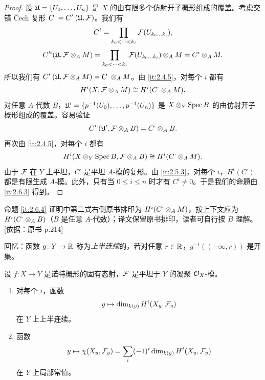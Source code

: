 \begin{proof}
设 $\mathfrak{U}=\{U_0,\dots,U_n\}$ 是 $X$ 的由有限多个仿射开子概形组成的覆盖。考虑交错 Čech 复形 $C^\cdot=C'^\cdot(\mathfrak{U},\mathcal{F})$。我们有
\[
C^i=\prod_{k_0<\cdots<k_i}\mathcal{F}(U_{k_0\dots k_i}),
\]
\[
C'^i(\mathfrak{U},\mathcal{F}\otimes_A M)=\prod_{k_0<\cdots<k_i}\mathcal{F}(U_{k_0\dots k_i})\otimes_A M=C^i\otimes_A M.
\]
所以我们有 $C'^\cdot(\mathfrak{U},\mathcal{F}\otimes_A M)=C^\cdot\otimes_A M$。由 \ref{it:2.4.5}，对每个 $i$ 都有
\[
H^i(X,\mathcal{F}\otimes_A M)\cong H^i(C^\cdot\otimes_A M).
\]
对任意 $A$-代数 $B$，$\mathfrak{U}'=\{p^{-1}(U_0),\dots,p^{-1}(U_n)\}$ 是 $X\otimes_Y\operatorname{Spec} B$ 的由仿射开子概形组成的覆盖。容易验证
\[
C'^\cdot(\mathfrak{U}',\mathcal{F}\otimes_A B)=C^\cdot\otimes_A B.
\]
再次由 \ref{it:2.4.5}，对每个 $i$ 都有
\[
H^i(X\otimes_Y\operatorname{Spec} B,\mathcal{F}\otimes_A B)\cong H^i(C^\cdot\otimes_A M).
\]
由于 $\mathcal{F}$ 在 $Y$ 上平坦，$C^\cdot$ 是平坦 $A$-模的复形。由 \ref{it:2.5.3}，对每个 $i$，$H^i(C^\cdot)$ 都是有限生成 $A$-模。此外，只有当 $0\le i\le n$ 时才有 $C^i\ne 0$。于是我们的命题由 \ref{it:2.6.3} 得到。
\end{proof}

\begin{tnote}
命题 \ref{it:2.6.4} 证明中第二式右侧原书排印为 $H^i(C^\cdot\otimes_A M)$，按上下文应为 $H^i(C^\cdot\otimes_A B)$（$B$ 是任意 $A$-代数）；译文保留原书排印，读者可自行按 $B$ 理解。[依据：原书 p.214]
\end{tnote}

回忆：函数 $g\colon Y\to\mathbb{R}$ 称为\emph{上半连续}的，若对任意 $r\in\mathbb{R}$，$g^{-1}((-\infty,r))$ 是开集。

\begin{theorem}[上半连续性定理]\label{it:2.6.5}
设 $f\colon X\to Y$ 是诺特概形的固有态射，$\mathcal{F}$ 是平坦于 $Y$ 的凝聚 $\mathcal{O}_X$-模。
\begin{enumerate}[label=(\roman*)]
\item 对每个 $i$，函数
\[
y\mapsto\dim_{k(y)}H^i(X_y,\mathcal{F}_y)
\]
在 $Y$ 上上半连续。
\item 函数
\[
y\mapsto\chi(X_y,\mathcal{F}_y)=\sum_i(-1)^i\dim_{k(y)}H^i(X_y,\mathcal{F}_y)
\]
在 $Y$ 上局部常值。
\end{enumerate}
\end{theorem}

